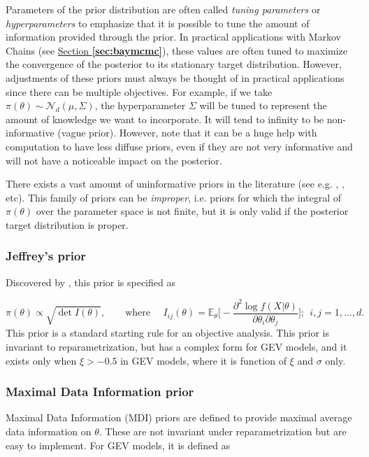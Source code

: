 Parameters of the prior distribution are often called \emph{tuning parameters} or \emph{hyperparameters} to emphasize that it is possible to tune the amount of information provided through the prior. In practical applications with  Markov Chains (see \hyperref[sec:baymcmc]{Section \textbf{\ref{sec:baymcmc}}}), these values are often tuned to maximize the convergence of the posterior to its stationary target distribution. However, adjustments of these priors must always be thought of in practical applications since there can be multiple objectives. For example, if we take $\pi(\theta)\sim\mathcal{N}_d(\mu,\Sigma)$,  the hyperparameter $\Sigma$ will be tuned to represent the amount of knowledge we want to incorporate. It will tend to infinity to be non-informative (vague prior). However, note that it can be a huge help with computation to have less diffuse priors, even
if they are not very informative and will not have a noticeable impact on the posterior.


There exists a vast amount of uninformative priors in the literature (see e.g. \cite{yang_catalog_1996}, \cite{ni_noninformative_2003}, etc).
This family of priors can be \emph{improper}, i.e. priors for which the integral of $\pi(\theta)$ over the parameter space is not finite, but it is only valid if the posterior target distribution is proper. 


\subsubsection*{Jeffrey's prior} 
Discovered by \citet{Jeffreys61a}, this prior is specified as 

\begin{equation}
\pi(\theta)\propto \sqrt{\det I(\theta)}, \qquad \text{where }\quad I_{ij}(\theta)=\mathbb{E}_{\theta}\Bigg[-\frac{\partial^2\log f(X|\theta)}{\partial\theta_i\partial\theta_j}\Bigg]; \ \ i,j= 1,\dots,d.
\end{equation}
This prior is a standard starting rule for an objective analysis.
This prior is invariant to reparametrization, but has a complex form for GEV models, and it exists only when $\xi>-0.5$ in GEV models, where it is function of $\xi$ and $\sigma$ only.


\subsubsection*{Maximal Data Information  prior}
Maximal Data Information (MDI) priors are defined to provide maximal average data information on $\theta$. These are not invariant under reparametrization but are easy to implement. For GEV models, it is defined as 

